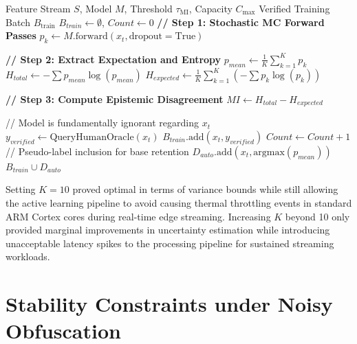 \documentclass[conference]{IEEEtran}
\begin{document}
\begin{algorithm}[htbp]
\caption{Information-Theoretic Sample Acquisition}
\label{alg:mc_bald}
\begin{algorithmic}[1]
\REQUIRE Feature Stream $S$, Model $M$, Threshold $\tau_{\mathrm{MI}}$, Capacity $C_{\mathrm{max}}$
\ENSURE Verified Training Batch $B_{\mathrm{train}}$
\STATE $B_{train} \leftarrow \emptyset$, $Count \leftarrow 0$
    \STATE \textbf{// Step 1: Stochastic MC Forward Passes}
        \STATE $p_k \leftarrow M.\text{forward}(x_t, \text{dropout}=\text{True})$
    \ENDFOR
    
    \STATE \textbf{// Step 2: Extract Expectation and Entropy}
    \STATE $p_{mean} \leftarrow \frac{1}{K} \sum_{k=1}^K p_k$
    \STATE $H_{total} \leftarrow - \sum p_{mean} \log(p_{mean})$
    \STATE $H_{expected} \leftarrow \frac{1}{K} \sum_{k=1}^K (- \sum p_k \log(p_k))$
    
    \STATE \textbf{// Step 3: Compute Epistemic Disagreement}
    \STATE $MI \leftarrow H_{total} - H_{expected}$
    
        \STATE // Model is fundamentally ignorant regarding $x_t$
        \STATE $y_{verified} \leftarrow \text{QueryHumanOracle}(x_t)$
        \STATE $B_{train}.\text{add}(x_t, y_{verified})$
        \STATE $Count \leftarrow Count + 1$
        \STATE // Pseudo-label inclusion for base retention
        \STATE $D_{auto}.\text{add}(x_t, \text{argmax}(p_{mean}))$
    \ENDIF
\ENDFOR
\RETURN $B_{train} \cup D_{auto}$
\end{algorithmic}
\end{algorithm}

Setting $K = 10$ proved optimal in terms of variance bounds while still allowing the active learning pipeline to avoid causing thermal throttling events in standard ARM Cortex cores during real-time edge streaming. Increasing $K$ beyond 10 only provided marginal improvements in uncertainty estimation while introducing unacceptable latency spikes to the processing pipeline for sustained streaming workloads.

\section{Stability Constraints under Noisy Obfuscation}
\end{document}
